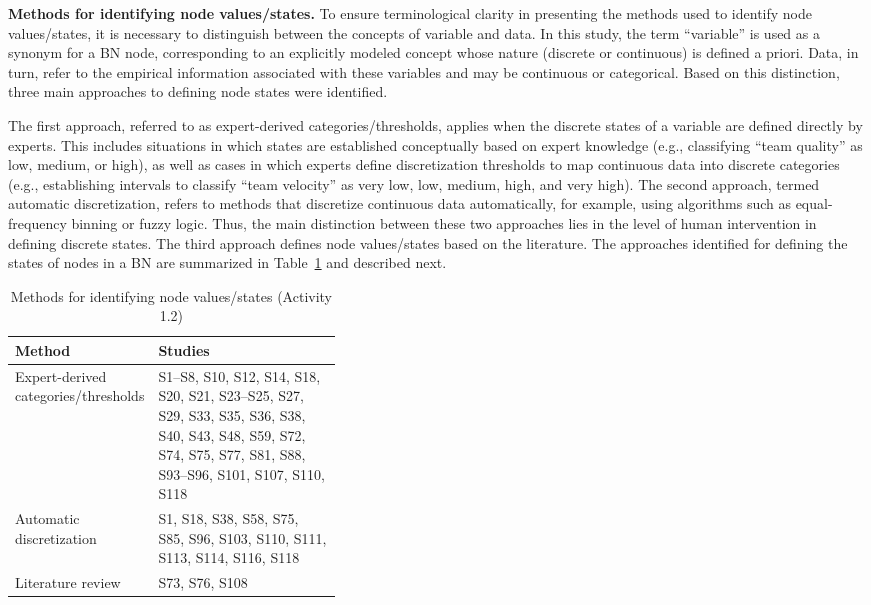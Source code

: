 \vspace*{0.5\baselineskip}

\textbf{Methods for identifying node values/states.} To ensure terminological clarity in presenting the methods used to identify node values/states, it is necessary to distinguish between the concepts of variable and data. In this study, the term ``variable'' is used as a synonym for a BN node, corresponding to an explicitly modeled concept whose nature (discrete or continuous) is defined a priori. Data, in turn, refer to the empirical information associated with these variables and may be continuous or categorical. Based on this distinction, three main approaches to defining node states were identified.

The first approach, referred to as expert-derived categories/thresholds, applies when the discrete states of a variable are defined directly by experts. This includes situations in which states are established conceptually based on expert knowledge (e.g., classifying ``team quality'' as low, medium, or high), as well as cases in which experts define discretization thresholds to map continuous data into discrete categories (e.g., establishing intervals to classify ``team velocity'' as very low, low, medium, high, and very high). The second approach, termed automatic discretization, refers to methods that discretize continuous data automatically, for example, using algorithms such as equal-frequency binning or fuzzy logic. Thus, the main distinction between these two approaches lies in the level of human intervention in defining discrete states. The third approach defines node values/states based on the literature. The approaches identified for defining the states of nodes in a BN are summarized in Table~\ref{tab:metodos_estados_nos} and described next.

\begin{table}[t]
\caption{Methods for identifying node values/states (Activity 1.2)}
\label{tab:metodos_estados_nos}
\centering
\small
\setlength{\tabcolsep}{6pt}
\renewcommand{\arraystretch}{1.2}

\begin{tabularx}{\linewidth}{>{\raggedright\arraybackslash}p{0.38\linewidth}
                              >{\raggedright\arraybackslash}X}
\toprule
\textbf{Method} & \textbf{Studies} \\
\midrule
Expert-derived categories/thresholds
& S1--S8, S10, S12, S14, S18, S20, S21, S23--S25, S27, S29, S33, S35, S36, S38, S40, S43, S48, S59, S72, S74, S75, S77, S81, S88, S93--S96, S101, S107, S110, S118 \\
Automatic discretization
& S1, S18, S38, S58, S75, S85, S96, S103, S110, S111, S113, S114, S116, S118 \\
Literature review
& S73, S76, S108 \\
\bottomrule
\end{tabularx}
\end{table}

